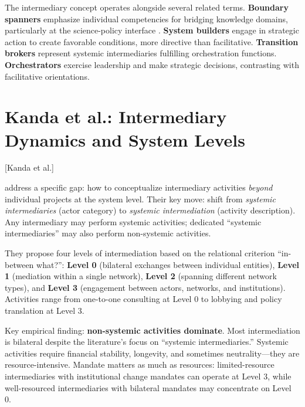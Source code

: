 \documentclass[../main.tex]{subfiles}
\begin{document}
The intermediary concept operates alongside several related terms. \textbf{Boundary spanners} emphasize individual competencies for bridging knowledge domains, particularly at the science-policy interface \cite{tushman1977boundary}. \textbf{System builders} engage in strategic action to create favorable conditions, more directive than facilitative. \textbf{Transition brokers} represent systemic intermediaries fulfilling orchestration functions. \textbf{Orchestrators} exercise leadership and make strategic decisions, contrasting with facilitative orientations.


\section{Kanda et al.: Intermediary Dynamics and System Levels}[Kanda et al.]

\textcite{kanda2020conceptualising} address a specific gap: how to conceptualize intermediary activities \textit{beyond} individual projects at the system level. Their key move: shift from \textit{systemic intermediaries} (actor category) to \textit{systemic intermediation} (activity description). Any intermediary may perform systemic activities; dedicated ``systemic intermediaries'' may also perform non-systemic activities.

They propose four levels of intermediation based on the relational criterion ``in-between what?'': \textbf{Level 0} (bilateral exchanges between individual entities), \textbf{Level 1} (mediation within a single network), \textbf{Level 2} (spanning different network types), and \textbf{Level 3} (engagement between actors, networks, and institutions). Activities range from one-to-one consulting at Level 0 to lobbying and policy translation at Level 3.

Key empirical finding: \textbf{non-systemic activities dominate}. Most intermediation is bilateral despite the literature's focus on ``systemic intermediaries.'' Systemic activities require financial stability, longevity, and sometimes neutrality---they are resource-intensive. Mandate matters as much as resources: limited-resource intermediaries with institutional change mandates can operate at Level 3, while well-resourced intermediaries with bilateral mandates may concentrate on Level 0.
\end{document}

